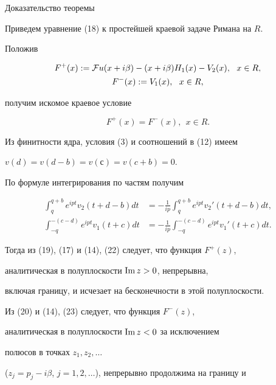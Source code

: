 \begin{pf*}{Доказательство теоремы}
\begin{equation}
\end{equation}


Приведем уравнение (18) к простейшей краевой задаче Римана на $R$.


Положив


\begin{gather}


F^+(x):={\cal F}u(x+i\beta)-(x+i\beta)H_1(x)-V_2(x),\ \ x\in R, \\


%


F^-(x):=V_1(x),\ \ x\in R,


\end{gather}


получим искомое краевое условие


\begin{equation}


F^+(x)=F^-(x),\ \ x\in R.


\end{equation}


Из финитности ядра, условия (3) и соотношений в (12) имеем


$v(d)=v(d-b)=v(с )=v(c+b)=0$.


По формуле интегрирования по частям получим


\begin{align}


\int_{q}^{q+b}


e^{ipt}v_2(t+d-b)dt&=-\frac{1}{ip}\int_{q}^{q+b}


e^{ipt}v_2'(t+d-b)dt,\\


%


\int_{-q}^{-(c-d)}e^{ipt}v_1(t+c)dt&=-\frac{1}{ip}\int_{-q}^{-(c-d)}


e^{ipt}v_1'(t+c)dt.


\end{align}


Тогда из (19), (17) и (14), (22) следует, что функция $F^+(z)$,


аналитическая в полуплоскости $\operatorname{Im} z>0$, непрерывна,


включая границу, и исчезает на бесконечности в этой полуплоскости.


Из (20) и (14), (23) следует, что функция $F^-(z)$,


аналитическая в полуплоскости $\operatorname{Im} z<0$ за исключением


полюсов в точках $z_1,z_2,\dotsc$


($z_j=p_j-i\beta$, $j=1,2,\dotsc$), непрерывно продолжима на границу и



\end{pf*}
